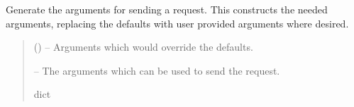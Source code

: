 \documentclass[letterpaper,11pt,english]{sphinxmanual}
\begin{document}
\begin{savenotes}
\begin{fulllineitems}
\begin{savenotes}
\begin{fulllineitems}
\begin{quote}
\begin{description}
\end{description}\end{quote}

\end{fulllineitems}\end{savenotes}


\begin{savenotes}\begin{fulllineitems}
\label{\detokenize{code/opihiexarata.astrometry.webclient:opihiexarata.astrometry.webclient.AstrometryNetWebAPIEngine._generate_upload_args}}
\pysigstartsignatures
{}
\pysigstopsignatures
\sphinxAtStartPar
Generate the arguments for sending a request. This constructs the
needed arguments, replacing the defaults with user provided arguments
where desired.
\begin{quote}\begin{description}
\sphinxAtStartPar
{} () – Arguments which would override the defaults.

\sphinxAtStartPar
{} – The arguments which can be used to send the request.

\sphinxAtStartPar
dict

\end{description}\end{quote}

\end{fulllineitems}\end{savenotes}



\end{fulllineitems}
\end{savenotes}
\end{document}
